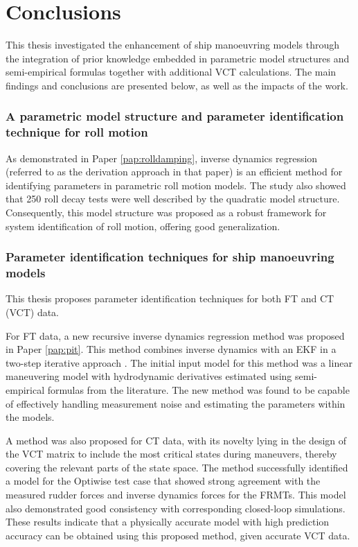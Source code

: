 \chapter{Conclusions\label{ch:conclusions}}

\noindent This thesis investigated the enhancement of ship manoeuvring models through the
integration of prior knowledge embedded in parametric model structures and semi-empirical
formulas together with additional VCT calculations. 
The main findings and conclusions are presented below, as well as the impacts of the work.

\subsection*{A parametric model structure and parameter identification technique for roll motion}
As demonstrated in Paper \ref{pap:rolldamping}, inverse dynamics regression (referred to as the derivation approach in that paper) is an efficient method for identifying parameters in parametric roll motion models. The study also showed that 250 roll decay tests were well described by the quadratic model structure. Consequently, this model structure was proposed as a robust framework for system identification of roll motion, offering good generalization.

\subsection*{Parameter identification techniques for ship manoeuvring models}
This thesis proposes parameter identification techniques for both FT and CT (VCT) data.

For FT data, a new recursive inverse dynamics regression method was proposed in Paper \ref{pap:pit}. This method combines inverse dynamics with an EKF in a two-step iterative approach \cite{yoonIdentificationHydrodynamicCoefficients2003}. The initial input model for this method was a linear maneuvering model with hydrodynamic derivatives estimated using semi-empirical formulas from the literature. The new method was found to be capable of effectively handling measurement noise and estimating the parameters within the models. 

A method was also proposed for CT data, with its novelty lying in the design of the VCT matrix to include the most critical states during maneuvers, thereby covering the relevant parts of the state space. The method successfully identified a model for the Optiwise test case that showed strong agreement with the measured rudder forces and inverse dynamics forces for the FRMTs. This model also demonstrated good consistency with corresponding closed-loop simulations. These results indicate that a physically accurate model with high prediction accuracy can be obtained using this proposed method, given accurate VCT data.  

